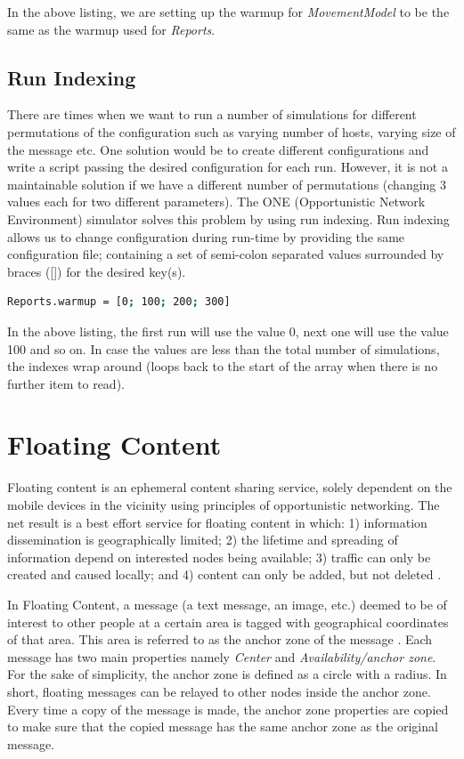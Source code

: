 In the above listing, we are setting up the warmup for \textit{MovementModel} to be the same as the warmup used for \textit{Reports}.

\subsection{Run Indexing}
There are times when we want to run a number of simulations for different permutations of the configuration such as varying number of hosts, varying size of the message etc. One solution would be to create different configurations and write a script passing the desired configuration for each run. However, it is not a maintainable solution if we have a different number of permutations (changing 3 values each for two different parameters). The ONE (Opportunistic Network Environment) simulator solves this problem by using run indexing. Run indexing allows us to change configuration during run-time by providing the same configuration file;  containing a set of semi-colon separated values surrounded by braces ([]) for the desired key(s).

\begin{lstlisting}[language=bash]
Reports.warmup = [0; 100; 200; 300]
\end{lstlisting}

In the above listing, the first run will use the value 0, next one will use the value 100 and so on. In case the values are less than the total number of simulations, the indexes wrap around (loops back to the start of the array when there is no further item to read).
\newpage
\section{Floating Content}
\label{section:floating-content}
Floating content is an ephemeral content sharing service, solely dependent on the mobile devices in the vicinity using principles of opportunistic networking. The net result is a best effort service for floating content in which: 1) information dissemination is geographically limited; 2) the lifetime and spreading of information depend on interested nodes being available; 3) traffic can only be created and caused locally; and 4) content can only be added, but not deleted \cite{floating-content}.

In Floating Content, a message (a text message, an image, etc.) deemed to be of interest to other people at a certain area is tagged with geographical coordinates of that area. This area is referred to as the anchor zone of the message \cite{floating-content-1}. Each message has two main properties namely \textit{Center} and \textit{Availability/anchor zone}. For the sake of simplicity, the anchor zone is defined as a circle with a radius. In short, floating messages can be relayed to other nodes inside the anchor zone. Every time a copy of the message is made, the anchor zone properties are copied to make sure that the copied message has the same anchor zone as the original message.

